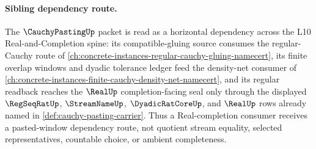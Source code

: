 \paragraph{Sibling dependency route.}
The $\CauchyPastingUp$ packet is read as a horizontal dependency across the L10 Real-and-Completion spine: its compatible-gluing source consumes the regular-Cauchy route of \autoref{ch:concrete-instances-regular-cauchy-gluing-namecert}, its finite overlap windows and dyadic tolerance ledger feed the density-net consumer of \autoref{ch:concrete-instances-finite-cauchy-density-net-namecert}, and its regular readback reaches the $\RealUp$ completion-facing seal only through the displayed $\RegSeqRatUp$, $\StreamNameUp$, $\DyadicRatCoreUp$, and $\RealUp$ rows already named in \autoref{def:cauchy-pasting-carrier}. Thus a Real-completion consumer receives a pasted-window dependency route, not quotient stream equality, selected representatives, countable choice, or ambient completeness.
